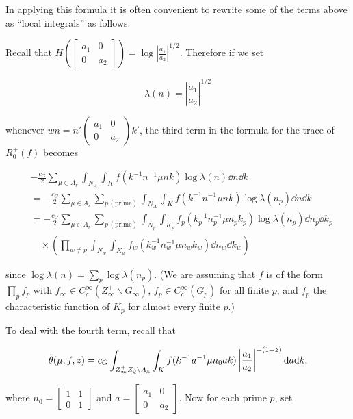 In applying this formula it is often convenient to rewrite some of the terms above as ``local integrals'' as follows.

Recall that $H\left(\begin{bmatrix} a_1 & 0 \\ 0 & a_2 \end{bmatrix}\right) = \log\left|\frac{a_1}{a_2}\right|^{1/2}$. Therefore if we set

\[
\lambda(n) = \left|\frac{a_1}{a_2}\right|^{1/2}
\]

whenever $wn = n'\begin{pmatrix} a_1 & 0 \\ 0 & a_2 \end{pmatrix}k'$, the third term in the formula for the trace of $R_0^{+}(f)$ becomes

\[
\begin{aligned}
&- \frac{c_G}{2}\sum_{\mu \in A_r}\int_{N_A}\int_K f(k^{-1}n^{-1}\mu nk)\log\lambda(n)\dd n\dd k\\
&= - \frac{c_G}{2}\sum_{\mu \in A_r}\sum_{p\,(\text{prime})}\int_{N_A}\int_K f(k^{-1}n^{-1}\mu nk)\log\lambda(n_p)\dd n\dd k\\
&= - \frac{c_G}{2}\sum_{\mu \in A_r}\sum_{p\,(\text{prime})}\int_{N_p}\int_{K_p} f_p(k_p^{-1}n_p^{-1}\mu n_pk_p)\log\lambda(n_p)\dd n_p\dd k_p\\
&\quad\times\left(\prod_{w \neq p}\int_{N_w}\int_{K_w} f_w(k_w^{-1}n_w^{-1}\mu n_wk_w)\dd n_w\dd k_w\right)
\end{aligned}
\]

since $\log\lambda(n) = \sum_p \log\lambda(n_p)$. (We are assuming that $f$ is of the form $\prod_p f_p$ with $f_\infty \in C_c^\infty(Z_\infty^{+} \backslash G_\infty)$, $f_p \in C_c^\infty(G_p)$ for all finite $p$, and $f_p$ the characteristic function of $K_p$ for almost every finite $p$.)

To deal with the fourth term, recall that

\[
\tilde{\theta}(\mu, f, z) = c_G\int_{Z_\infty^{+}Z_{\mathbb{Q}} \backslash A_{\mathbb{A}}}\int_K f(k^{-1}a^{-1}\mu n_0ak)\left|\frac{a_1}{a_2}\right|^{-(1+z)}\mathrm{d} a\mathrm{d} k,
\]

where $n_0 = \begin{bmatrix} 1 & 1 \\ 0 & 1 \end{bmatrix}$ and $a = \begin{bmatrix} a_1 & 0 \\ 0 & a_2 \end{bmatrix}$. Now for each prime $p$, set

